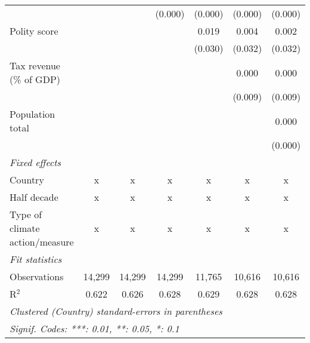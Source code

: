 \begin{tabular}{lcccccc}
                                                                               &         &               & (0.000)        & (0.000)        & (0.000)        & (0.000)\\   
   Polity score                                                                &         &               &                & 0.019          & 0.004          & 0.002\\   
                                                                               &         &               &                & (0.030)        & (0.032)        & (0.032)\\   
   Tax revenue (\% of GDP)                                                     &         &               &                &                & 0.000          & 0.000\\   
                                                                               &         &               &                &                & (0.009)        & (0.009)\\   
   Population total                                                            &         &               &                &                &                & 0.000\\   
                                                                               &         &               &                &                &                & (0.000)\\   
   \emph{Fixed effects}\\
   Country                                                                     & x       & x             & x              & x              & x              & x\\  
   Half decade                                                                 & x       & x             & x              & x              & x              & x\\  
   Type of climate action/measure                                              & x       & x             & x              & x              & x              & x\\  
   \midrule \emph{Fit statistics}\\
   Observations                                                                & 14,299  & 14,299        & 14,299         & 11,765         & 10,616         & 10,616\\  
   R$^2$                                                                       & 0.622   & 0.626         & 0.628          & 0.629          & 0.628          & 0.628\\  
   \midrule
   \multicolumn{7}{l}{\emph{Clustered (Country) standard-errors in parentheses}}\\
   \multicolumn{7}{l}{\emph{Signif. Codes: ***: 0.01, **: 0.05, *: 0.1}}\\
\end{tabular}
\par\endgroup



